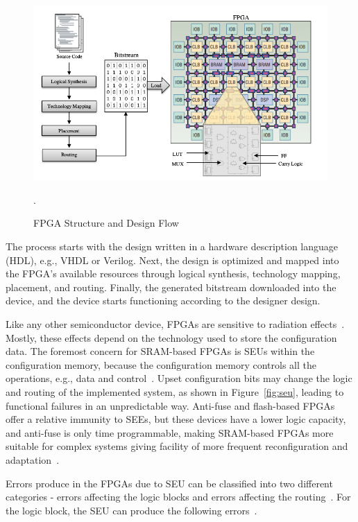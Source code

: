 \begin{figure}[tb!]
 \centering
  \captionsetup{justification=centering}    
   \includegraphics[scale=0.4]{figures/img/FPGA-structure.png}
   \caption{FPGA Structure and Design Flow~\citep{manuzzato2010single}}.
\label{fig:fpga-struct}
\end{figure}




The process starts with the design written
in a hardware description language (HDL), e.g., VHDL or Verilog. Next, the design is optimized and mapped into the FPGA’s available resources through logical synthesis,
technology mapping, placement, and routing. Finally, the generated bitstream downloaded into the device, and the device starts functioning according to the designer design.


Like any other semiconductor device, FPGAs are sensitive to radiation effects~\citep{hobeika2014multi}.
Mostly, these effects depend on the technology used to store the configuration data.
The foremost concern for SRAM-based FPGAs is
SEUs within the configuration memory, because the configuration memory controls all the operations, e.g., data and control~\citep{manuzzato2010single}.
Upset configuration bits may change the logic and routing of the implemented system, as
shown in Figure~\ref{fig:seu}, leading to functional failures in an unpredictable way. Anti-fuse and flash-based
FPGAs offer a relative immunity to SEEs, but these devices have a lower logic capacity, and anti-fuse is only time programmable, making SRAM-based FPGAs more
suitable for complex systems giving facility of more frequent reconfiguration and adaptation~\citep{quinn2015validation, violante2004simulation}. 

Errors produce in the FPGAs due to SEU can be classified into two different categories - errors affecting the logic blocks and errors affecting the routing~\citep{sterpone2006new}. For the logic block, the SEU can produce the following errors~\citep{sterpone2006new}.

